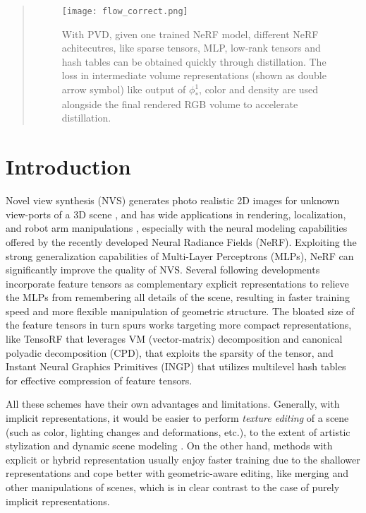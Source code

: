 \documentclass[letterpaper]{article} \usepackage{aaai23}  \usepackage{times}  \usepackage{helvet}  \usepackage{courier}  \usepackage[hyphens]{url}  \usepackage{graphicx} \urlstyle{rm} \def\UrlFont{\rm}  \usepackage{natbib}  \usepackage{caption} \frenchspacing  \setlength{\pdfpagewidth}{8.5in}  \setlength{\pdfpageheight}{11in}  \usepackage{multirow}
\begin{document}
\begin{abstract}
\begin{figure*}[t]
\centering
\texttt{[image: flow\_correct.png]} \caption{ With PVD, given one trained NeRF model, different NeRF achitecutres, like sparse tensors, MLP, low-rank tensors and hash tables can be obtained quickly through distillation. The loss in intermediate volume representations (shown as double arrow symbol) like output of $\phi_{*}^1$, color and density are used alongside the final rendered RGB volume to accelerate distillation.}
\label{fig-flow}
\end{figure*}









\end{abstract}

\section{Introduction}
Novel view synthesis (NVS) generates photo realistic 2D images for unknown view-ports of a 3D scene \cite{zhou2018stereo,chan2021pi,sitzmann2019scene}, and has wide applications in rendering, localization, and robot arm manipulations \cite{adamkiewicz2022vision,moreau2022lens,peng2021megloc}, especially with the neural modeling capabilities offered by the recently developed Neural Radiance Fields (NeRF).
Exploiting the strong generalization capabilities of Multi-Layer Perceptrons (MLPs), NeRF can significantly improve the quality of NVS.
Several following developments incorporate feature tensors as complementary explicit representations to relieve the MLPs from remembering all details of the scene, resulting in faster training speed and more flexible manipulation of geometric structure. The bloated size of the feature tensors in turn spurs works targeting more compact representations, like TensoRF \cite{chen2022tensorf} that leverages VM (vector-matrix) decomposition and canonical polyadic decomposition (CPD), \citeauthor{fridovich2022plenoxels} that exploits the sparsity of the tensor, and Instant Neural Graphics Primitives (INGP) \cite{muller2022instant} that utilizes multilevel hash tables for effective compression of feature tensors.


All these schemes have their own advantages and limitations. 
Generally, with implicit representations, it would be easier to perform \textit{texture editing} of a scene (such as color, lighting changes and deformations, etc.), to the extent of artistic stylization and dynamic scene modeling \cite{tang2022CCNeRF, kobayashi2022decomposingEditing,pumarola2021dNeRF,gu2021styleNeRF,zhan2021multimodal}. 
On the other hand, methods with explicit or hybrid representation usually enjoy faster training due to the shallower representations and cope better with geometric-aware editing, like merging and other manipulations of scenes, which is in clear contrast to the case of purely implicit representations.
\end{document}
